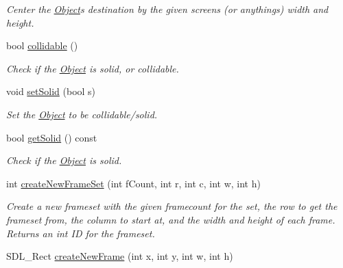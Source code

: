 \begin{DoxyCompactItemize}
\begin{DoxyCompactList}\small\item\em Center the \hyperlink{classObject}{Object}\textquotesingle{}s destination by the given screens (or anythings) width and height. \end{DoxyCompactList}\item 
bool \hyperlink{classObject_a2a09d094befe949a0b879a62244de46e}{collidable} ()\hypertarget{classObject_a2a09d094befe949a0b879a62244de46e}{}\label{classObject_a2a09d094befe949a0b879a62244de46e}

\begin{DoxyCompactList}\small\item\em Check if the \hyperlink{classObject}{Object} is solid, or collidable. \end{DoxyCompactList}\item 
void \hyperlink{classObject_a470cdfc175b5fb0bd324a585ee5fce3f}{set\+Solid} (bool s)\hypertarget{classObject_a470cdfc175b5fb0bd324a585ee5fce3f}{}\label{classObject_a470cdfc175b5fb0bd324a585ee5fce3f}

\begin{DoxyCompactList}\small\item\em Set the \hyperlink{classObject}{Object} to be collidable/solid. \end{DoxyCompactList}\item 
bool \hyperlink{classObject_a5efbee91dd5bf04c6fb4bffef99ceba8}{get\+Solid} () const \hypertarget{classObject_a5efbee91dd5bf04c6fb4bffef99ceba8}{}\label{classObject_a5efbee91dd5bf04c6fb4bffef99ceba8}

\begin{DoxyCompactList}\small\item\em Check if the \hyperlink{classObject}{Object} is solid. \end{DoxyCompactList}\item 
int \hyperlink{classObject_a21238c368f570c14722cb00b74353732}{create\+New\+Frame\+Set} (int f\+Count, int r, int c, int w, int h)\hypertarget{classObject_a21238c368f570c14722cb00b74353732}{}\label{classObject_a21238c368f570c14722cb00b74353732}

\begin{DoxyCompactList}\small\item\em Create a new frameset with the given framecount for the set, the row to get the frameset from, the column to start at, and the width and height of each frame. Returns an int ID for the frameset. \end{DoxyCompactList}\item 
S\+D\+L\+\_\+\+Rect \hyperlink{classObject_a7a2350db0bae3e53ca9f928e08241159}{create\+New\+Frame} (int x, int y, int w, int h)\hypertarget{classObject_a7a2350db0bae3e53ca9f928e08241159}{}\label{classObject_a7a2350db0bae3e53ca9f928e08241159}


\end{DoxyCompactItemize}
